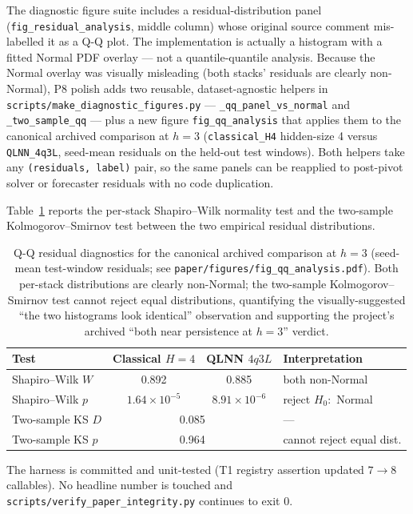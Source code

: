 \documentclass[%
  prx,
  amsmath,
  amssymb,
  aps,
  reprint,
  superscriptaddress,
  floatfix,
]{revtex4-2}
\begin{document}
The diagnostic figure suite includes a residual-distribution panel
(\texttt{fig\_residual\_analysis}, middle column) whose original
source comment mis-labelled it as a Q-Q plot. The implementation is
actually a histogram with a fitted Normal PDF overlay --- not a
quantile-quantile analysis. Because the Normal overlay was visually
misleading (both stacks' residuals are clearly non-Normal), P8 polish
adds two reusable, dataset-agnostic helpers in
\texttt{scripts/make\_diagnostic\_figures.py} ---
\texttt{\_qq\_panel\_vs\_normal} and \texttt{\_two\_sample\_qq} ---
plus a new figure \texttt{fig\_qq\_analysis} that applies them to the
canonical archived comparison at $h=3$ (\texttt{classical\_H4}
hidden-size 4 versus \texttt{QLNN\_4q3L}, seed-mean residuals on the
held-out test windows). Both helpers take any
\texttt{(residuals, label)} pair, so the same panels can be reapplied
to post-pivot solver or forecaster residuals with no code
duplication.

Table~\ref{sup:tab:qq} reports the per-stack Shapiro--Wilk normality
test and the two-sample Kolmogorov--Smirnov test between the two
empirical residual distributions.

\begin{table}[h]
\centering
\caption{Q-Q residual diagnostics for the canonical archived
comparison at $h=3$ (seed-mean test-window residuals; see
\texttt{paper/figures/fig\_qq\_analysis.pdf}). Both per-stack
distributions are clearly non-Normal; the two-sample Kolmogorov--
Smirnov test cannot reject equal distributions, quantifying the
visually-suggested ``the two histograms look identical'' observation
and supporting the project's archived ``both near persistence at
$h=3$'' verdict.}
\label{sup:tab:qq}
\small
\begin{tabular}{lccl}
\toprule
Test & Classical $H{=}4$ & QLNN $4q3L$ & Interpretation \\
\midrule
Shapiro--Wilk $W$ & 0.892 & 0.885 & both non-Normal \\
Shapiro--Wilk $p$ & $1.64{\times}10^{-5}$ & $8.91{\times}10^{-6}$ & reject $H_0{:}$ Normal \\
Two-sample KS $D$ & \multicolumn{2}{c}{0.085} & --- \\
Two-sample KS $p$ & \multicolumn{2}{c}{0.964} & cannot reject equal dist. \\
\bottomrule
\end{tabular}
\end{table}

The harness is committed and unit-tested (T1 registry assertion
updated $7 \to 8$ callables). No headline number is touched and
\texttt{scripts/verify\_paper\_integrity.py} continues to exit $0$.
\end{document}
